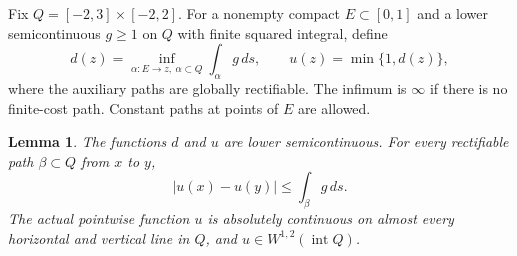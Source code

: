 \documentclass[11pt]{article}
\newtheorem{lemma}{Lemma}
\begin{document}
Fix $Q=[-2,3]\times[-2,2]$. For a nonempty compact $E\subset[0,1]$ and
a lower semicontinuous $g\geq1$ on $Q$ with finite squared integral, define
\begin{equation}\label{eq:distance}
 d(z)=\inf_{\alpha:E\to z,\ \alpha\subset Q}\int_\alpha g\,ds,
 \qquad u(z)=\min\{1,d(z)\},
\end{equation}
where the auxiliary paths are globally rectifiable. The infimum is $\infty$
if there is no finite-cost path. Constant paths at points of $E$ are allowed.

\begin{lemma}\label{lem:potential}
The functions $d$ and $u$ are lower semicontinuous. For every rectifiable
path $\beta\subset Q$ from $x$ to $y$,
\begin{equation}\label{eq:uppergradient}
 |u(x)-u(y)|\leq\int_\beta g\,ds.
\end{equation}
The actual pointwise function $u$ is absolutely continuous on almost every
horizontal and vertical line in $Q$, and $u\in W^{1,2}(\operatorname{int}Q)$.
\end{lemma}
\end{document}
